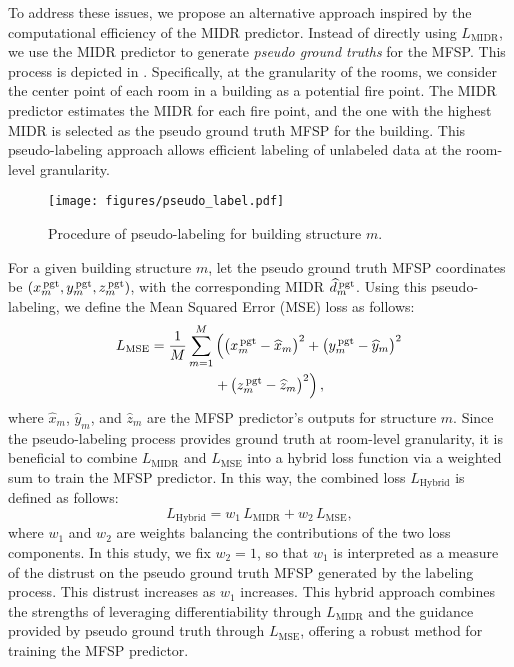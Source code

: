 To address these issues, we propose an alternative approach inspired by the computational efficiency of the MIDR predictor. Instead of directly using $L_{\text{MIDR}}$, we use the MIDR predictor to generate {\em{pseudo ground truths}} for the MFSP. This process is depicted in . Specifically, at the granularity of the rooms, we consider the center point of each room in a building as a potential fire point. The MIDR predictor estimates the MIDR for each fire point, and the one with the highest MIDR is selected as the pseudo ground truth MFSP for the building. This pseudo-labeling approach allows efficient labeling of unlabeled data at the room-level granularity.
\begin{figure*}[h!]
    \centering
    \texttt{[image: figures/pseudo\_label.pdf]}
    \caption{Procedure of pseudo-labeling for building structure $m$.}
    \label{fig:pseudo_label}
\end{figure*}

For a given building structure $m$, let the pseudo ground truth MFSP coordinates be $\left( x_{m}^{\, \text{pgt}}, y_{m}^{\, \text{pgt}}, z_{m}^{\, \text{pgt}}\right)$, with the corresponding MIDR $\widehat{d}_{m}^{\, \text{pgt}}$. Using this pseudo-labeling, we define the Mean Squared Error (MSE) loss as follows:  
\begin{equation}
    \begin{aligned}
        L_{\text{MSE}} = \frac{1}{M}\sum_{m=1}^{M}&\left( \left( x_{m}^{\, \text{pgt}} - \widehat{x}_{m} \right)^2 + \left( y_{m}^{\, \text{pgt}} - \widehat{y}_{m} \right)^2 \right. \\  
        & \left.+ \left( z_{m}^{\, \text{pgt}} - \widehat{z}_{m} \right)^2 \right),
    \end{aligned}
    \label{eq:MSE}
\end{equation}
where $\widehat{x}_{m}$, $\widehat{y}_{m}$, and $\widehat{z}_{m}$ are the MFSP predictor's outputs for structure $m$. Since the pseudo-labeling process provides ground truth at room-level granularity, it is beneficial to combine $L_{\text{MIDR}}$ and $L_{\text{MSE}}$ into a hybrid loss function via a weighted sum to train the MFSP predictor. In this way, the combined loss $L_{\text{Hybrid}}$ is defined as follows:  
\begin{equation}
    L_{\text{Hybrid}} = w_1 \, L_{\text{MIDR}} + w_2 \, L_{\text{MSE}},
    \label{eq:hybrid}
\end{equation}  
where $w_1$ and $w_2$ are weights balancing the contributions of the two loss components. In this study, we fix $w_2=1$, so that $w_1$ is interpreted as a measure of the distrust on the pseudo ground truth MFSP generated by the labeling process. This distrust increases as $w_1$ increases. This hybrid approach combines the strengths of leveraging differentiability through $L_{\text{MIDR}}$ and the guidance provided by pseudo ground truth through $L_{\text{MSE}}$, offering a robust method for training the MFSP predictor.

